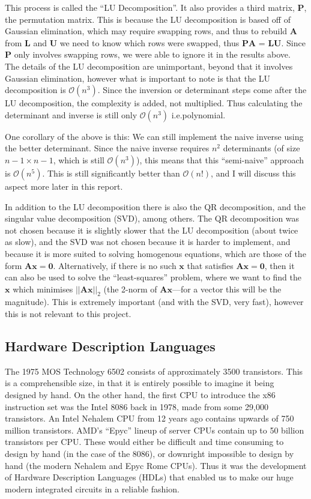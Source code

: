 \documentclass[12pt]{article}
\begin{document}
This process is called the ``LU Decomposition''\cite{lu_decomposition}. It also provides a third matrix, $\mathbf{P}$, the permutation matrix. This is because the LU decomposition is based off of Gaussian elimination, which may require swapping rows, and thus to rebuild $\mathbf{A}$ from $\mathbf{L}$ and $\mathbf{U}$ we need to know which rows were swapped, thus $\mathbf{PA}$ = $\mathbf{LU}$. Since $\mathbf{P}$ only involves swapping rows, we were able to ignore it in the results above. The details of the LU decomposition are unimportant, beyond that it involves Gaussian elimination, however what is important to note is that the LU decomposition is $\mathcal{O}(n^3)$. Since the inversion or determinant steps come after the LU decomposition, the complexity is added, not multiplied. Thus calculating the determinant and inverse is still only $\mathcal{O}(n^3)$ i.e.\@ polynomial.

One corollary of the above is this: We can still implement the naive inverse using the better determinant. Since the naive inverse requires $n^2$ determinants (of size $n-1 \times n-1$, which is still $\mathcal{O}(n^3)$), this means that this ``semi-naive'' approach is $\mathcal{O}(n^5)$. This is still significantly better than $\mathcal{O}(n!)$, and I will discuss this aspect more later in this report.

In addition to the LU decomposition there is also the QR decomposition, and the singular value decomposition (SVD)\cite{num_lin_alg}, among others. The QR decomposition was not chosen because it is slightly slower that the LU decomposition (about twice as slow), and the SVD was not chosen because it is harder to implement, and because it is more suited to solving homogenous equations, which are those of the form $\mathbf{A}\mathbf{x}=\mathbf{0}$. Alternatively, if there is no such $\mathbf{x}$ that satisfies $\mathbf{A}\mathbf{x}=\mathbf{0}$, then it can also be used to solve the ``least-squares'' problem, where we want to find the $\mathbf{x}$ which minimises $||\mathbf{Ax}||_2$ (the 2-norm of $\mathbf{Ax}$---for a vector this will be the magnitude). This is extremely important (and with the SVD, very fast), however this is not relevant to this project.

\subsection{Hardware Description Languages}

The 1975 MOS Technology 6502 consists of approximately 3500 transistors. This is a comprehensible size, in that it is entirely possible to imagine it being designed by hand. On the other hand, the first CPU to introduce the x86 instruction set was the Intel 8086 back in 1978, made from some 29,000 transistors. An Intel Nehalem CPU from 12 years ago contains upwards of 750 million transistors. AMD's ``Epyc'' lineup of server CPUs contain up to 50 billion transistors per CPU. These would either be difficult and time consuming to design by hand (in the case of the 8086), or downright impossible to design by hand (the modern Nehalem and Epyc Rome CPUs). Thus it was the development of Hardware Description Languages (HDLs) that enabled us to make our huge modern integrated circuits in a reliable fashion.
\end{document}
